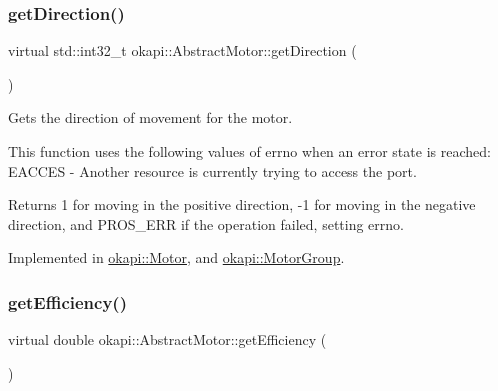\mbox{\label{classokapi_1_1AbstractMotor_a94763d1700bd91b995333b012c0b683f}} 
\subsubsection{\texorpdfstring{getDirection()}{getDirection()}}
{\footnotesize\ttfamily virtual std\+::int32\+\_\+t okapi\+::\+Abstract\+Motor\+::get\+Direction (\begin{DoxyParamCaption}{ }\end{DoxyParamCaption})\hspace{0.3cm}{\ttfamily [pure virtual]}}

Gets the direction of movement for the motor.

This function uses the following values of errno when an error state is reached\+: E\+A\+C\+C\+ES -\/ Another resource is currently trying to access the port.

\begin{DoxyReturn}{Returns}
1 for moving in the positive direction, -\/1 for moving in the negative direction, and P\+R\+O\+S\+\_\+\+E\+RR if the operation failed, setting errno. 
\end{DoxyReturn}


Implemented in \mbox{\hyperlink{classokapi_1_1Motor_a72c69d60e2ec69c126c84dc81f78742d}{okapi\+::\+Motor}}, and \mbox{\hyperlink{classokapi_1_1MotorGroup_a5466d52a245b10765945b91c0194da66}{okapi\+::\+Motor\+Group}}.

\mbox{\label{classokapi_1_1AbstractMotor_a27a6e3ec007619a9b91f9d6ebc61e613}} 
\subsubsection{\texorpdfstring{getEfficiency()}{getEfficiency()}}
{\footnotesize\ttfamily virtual double okapi\+::\+Abstract\+Motor\+::get\+Efficiency (\begin{DoxyParamCaption}{ }\end{DoxyParamCaption})\hspace{0.3cm}{\ttfamily [pure virtual]}}


